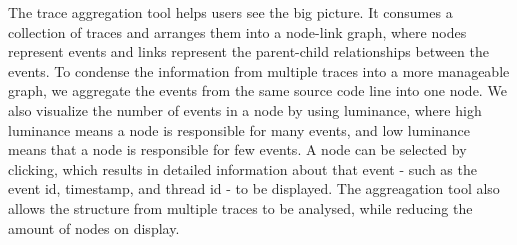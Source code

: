 The trace aggregation tool helps users see the big picture. It consumes a collection of traces and arranges
them into a node-link graph, where nodes represent events and links represent the parent-child relationships between
the events. To condense the information from multiple traces into a more manageable graph, we aggregate the events
from the same source code line into one node. We also visualize the number of events in a node by using luminance, where high
luminance means a node is responsible for many events, and low luminance means that a node is responsible for few events. A node can
be selected by clicking, which results in detailed information about that event - such as the event id, timestamp, and thread id - to be displayed.
The aggreagation tool also allows the structure from multiple traces to be analysed, while reducing the amount of nodes on display.

